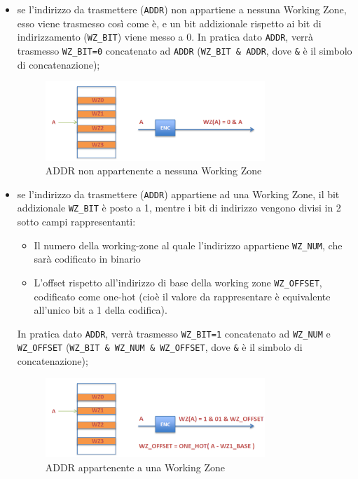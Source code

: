 \documentclass{article}
\begin{document}
\begin{itemize}
\item se l'indirizzo da trasmettere (\verb^ADDR^) non appartiene a nessuna Working Zone, esso viene trasmesso così come è, e un bit addizionale rispetto ai bit di indirizzamento (\verb^WZ_BIT^) viene messo a 0. In pratica dato \verb^ADDR^, verrà trasmesso \verb^WZ_BIT=0^ concatenato ad \verb^ADDR^ (\verb^WZ_BIT & ADDR^, dove \verb^&^ è il simbolo di concatenazione);
\begin{figure}[H]
    \centering
    \includegraphics[height=3cm]{images/codifica-fuori-wz.png}
    \caption{ADDR non appartenente a nessuna Working Zone}
    \label{fig:codifica-fuori-wz}
\end{figure}
\item se l'indirizzo da trasmettere (\verb^ADDR^) appartiene ad una Working Zone, il bit addizionale \verb^WZ_BIT^ è posto a 1, mentre i bit di indirizzo vengono divisi in 2 sotto campi rappresentanti:
\begin{itemize}[label=$\circ$]
\item Il numero della working-zone al quale l'indirizzo appartiene \verb^WZ_NUM^, che sarà codificato in binario
\item L'offset rispetto all'indirizzo di base della working zone \verb^WZ_OFFSET^, codificato come one-hot (cioè il valore da rappresentare è equivalente all'unico bit a 1 della codifica).
\end{itemize}
In pratica dato \verb^ADDR^, verrà trasmesso \verb^WZ_BIT=1^ concatenato ad \verb^WZ_NUM^ e \verb^WZ_OFFSET^ (\texttt{WZ\_BIT \& WZ\_NUM \& WZ\_OFFSET}, dove \verb^&^ è il simbolo di concatenazione);
\begin{figure}[H]
    \centering
    \includegraphics[height=3cm]{images/codifica-dentro-wz.png}
    \caption{ADDR appartenente a una Working Zone}
    \label{fig:codifica-dentro-wz}
\end{figure}
\end{itemize}
\end{document}
